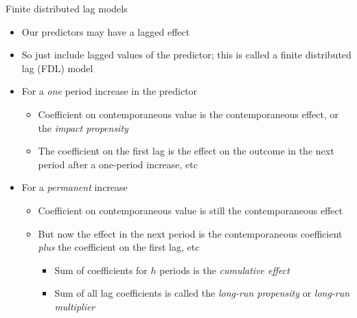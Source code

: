 \documentclass[
  ignorenonframetext,
]{beamer}
\providecommand{\tightlist}{%
  \setlength{\itemsep}{0pt}\setlength{\parskip}{0pt}}
\newcommand{\setsep}{\setlength{\itemsep}{3pt}}
\newcommand{\setskip}{\setlength{\parskip}{3pt}}
\renewcommand{\tightlist}{\setsep\setskip}
\begin{document}
\begin{frame}{Finite distributed lag models}
\protect\hypertarget{finite-distributed-lag-models}{}
\pause

\begin{itemize}[<+->]
\tightlist
\item
  Our predictors may have a lagged effect
\item
  So just include lagged values of the predictor;
  this is called a finite distributed lag (FDL) model
\item
  For a \emph{one} period increase in the predictor

  \begin{itemize}[<+->]
  \tightlist
  \item
    Coefficient on contemporaneous value is the contemporaneous effect, or the \emph{impact propensity}
  \item
    The coefficient on the first lag is the effect on the outcome in the next period after a one-period increase, etc
  \end{itemize}
\item
  For a \emph{permanent} increase

  \begin{itemize}[<+->]
  \tightlist
  \item
    Coefficient on contemporaneous value is still the contemporaneous effect
  \item
    But now the effect in the next period is the contemporaneous coefficient \emph{plus} the coefficient on the first lag, etc

    \begin{itemize}[<+->]
    \tightlist
    \item
      Sum of coefficients for \(h\) periods is the \emph{cumulative effect}
    \item
      Sum of all lag coefficients is called the \emph{long-run propensity} or \emph{long-run multiplier}
    \end{itemize}
  \end{itemize}
\end{itemize}
\end{frame}
\end{document}
